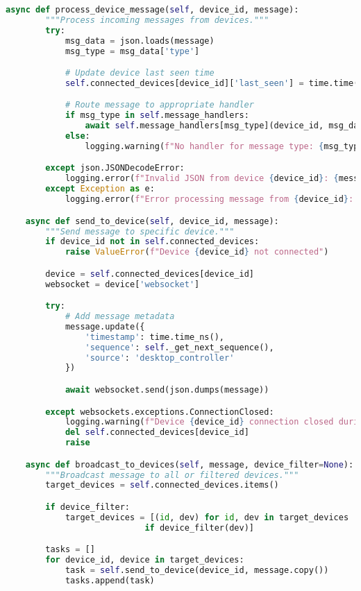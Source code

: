 \begin{lstlisting}[language=Python, caption=Network Communication Implementation]
    async def process_device_message(self, device_id, message):
        """Process incoming messages from devices."""
        try:
            msg_data = json.loads(message)
            msg_type = msg_data['type']

            # Update device last seen time
            self.connected_devices[device_id]['last_seen'] = time.time()

            # Route message to appropriate handler
            if msg_type in self.message_handlers:
                await self.message_handlers[msg_type](device_id, msg_data)
            else:
                logging.warning(f"No handler for message type: {msg_type}")

        except json.JSONDecodeError:
            logging.error(f"Invalid JSON from device {device_id}: {message}")
        except Exception as e:
            logging.error(f"Error processing message from {device_id}: {e}")

    async def send_to_device(self, device_id, message):
        """Send message to specific device."""
        if device_id not in self.connected_devices:
            raise ValueError(f"Device {device_id} not connected")

        device = self.connected_devices[device_id]
        websocket = device['websocket']

        try:
            # Add message metadata
            message.update({
                'timestamp': time.time_ns(),
                'sequence': self._get_next_sequence(),
                'source': 'desktop_controller'
            })

            await websocket.send(json.dumps(message))

        except websockets.exceptions.ConnectionClosed:
            logging.warning(f"Device {device_id} connection closed during send")
            del self.connected_devices[device_id]
            raise

    async def broadcast_to_devices(self, message, device_filter=None):
        """Broadcast message to all or filtered devices."""
        target_devices = self.connected_devices.items()

        if device_filter:
            target_devices = [(id, dev) for id, dev in target_devices
                            if device_filter(dev)]

        tasks = []
        for device_id, device in target_devices:
            task = self.send_to_device(device_id, message.copy())
            tasks.append(task)


\end{lstlisting}
